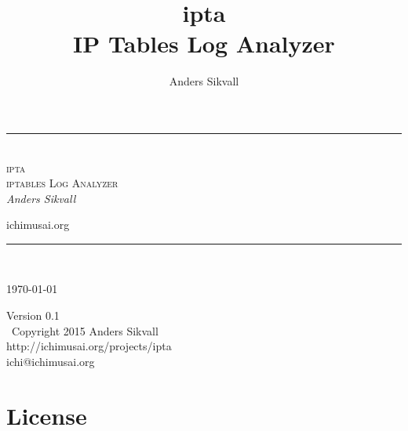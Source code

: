 \documentclass[english,twoside,openright,a4paper,12pt]{article}
\author{Anders Sikvall}
\title{
	\Huge ipta\\[2em]
	IP Tables Log Analyzer}
\newcommand{\titlerule}{\rule{\linewidth}{1pt}}
\begin{document}
\begin{titlepage}
  \thispagestyle{empty}
  \begin{center}
  \end{center}
  \begin{center}
    \titlerule\\[3mm]
    \Huge \textsc{ipta\\\Large iptables Log Analyzer}\\[5mm]
    \large \emph{Anders Sikvall}\\
    \begin{center}
      \normalsize ichimusai.org\\
      
    \end{center}
    \titlerule\\
  \end{center}
  \scriptsize \today
\end{titlepage}

\null\vfill\thispagestyle{empty}
\noindent

\begin{center}
	Version 0.1\\[5mm] \textcopyright\ Copyright 2015 Anders Sikvall\\
	http://ichimusai.org/projects/ipta\\
	ichi@ichimusai.org
	\newpage
\end{center}

\cleardoublepage

\tableofcontents

\setlength{\parindent}{0pt}
\setlength{\parskip}{1em}

\lhead{\nouppercase{\leftmark}}
\rhead{\nouppercase{\rightmark}}

\setlength{\headheight}{15pt}

\pagestyle{fancy}


\newpage
\section*{License}
\label{license}
\end{document}
